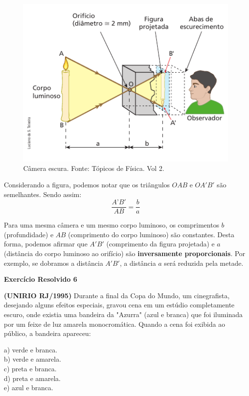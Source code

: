 \documentclass[11pt,twocolumn,oneside]{article}
\begin{document}
\begin{figure}[h]{}
\centering\includegraphics[width=2.5truein]{img22.png}
\caption{Câmera escura. Fonte: Tópicos de Física. Vol 2.}
\centering
\end{figure}

Considerando a figura, podemos notar que os triângulos $OAB$ e $OA'B'$ são semelhantes. Sendo assim:
\begin{equation*}
    \dfrac{A’B'}{AB}=\dfrac{b}{a}
\end{equation*}


Para uma mesma câmera e um mesmo corpo luminoso, os comprimentos \textbf{$b$} (profundidade) e \textbf{$AB$} (comprimento do corpo luminoso) são constantes. Desta forma, podemos afirmar que \textbf{$A'B'$} (comprimento da figura projetada) e \textbf{$a$} (distância do corpo luminoso ao orifício) são \textbf{inversamente proporcionais}. Por exemplo, se dobramos a distância \textbf{$A'B'$}, a distância \textbf{$a$} será reduzida pela metade.


\textbf{Exercício Resolvido 6}


\textbf{(UNIRIO RJ/1995)} Durante a final da Copa do Mundo, um cinegrafista, desejando alguns efeitos especiais, gravou cena em um estúdio completamente escuro, onde existia uma bandeira da "Azurra" (azul e branca) que foi iluminada por um feixe de luz amarela monocromática. Quando a cena foi exibida ao público, a bandeira apareceu:


a)	verde e branca. \\
b)	verde e amarela. \\
c)	preta e branca. \\
d)	preta e amarela. \\
e)	azul e branca.
\end{document}

